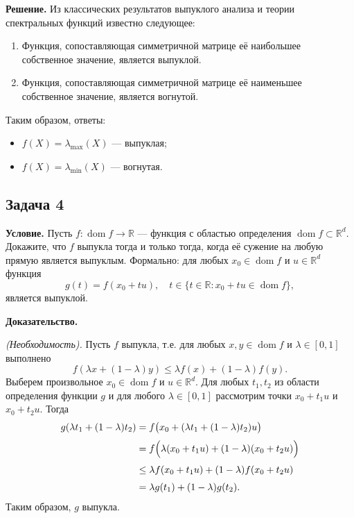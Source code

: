 \documentclass[a4paper,12pt]{article}
\begin{document}
	
	\textbf{Решение.} Из классических результатов выпуклого анализа и теории спектральных функций известно следующее:
	\begin{enumerate}[label=1)]
		\item Функция, сопоставляющая симметричной матрице её наибольшее собственное значение, является выпуклой.
		\item Функция, сопоставляющая симметричной матрице её наименьшее собственное значение, является вогнутой.
	\end{enumerate}
	Таким образом, ответы: 
	\begin{itemize}
		\item $f(X)=\lambda_{\max}(X)$ --- выпуклая;
		\item $f(X)=\lambda_{\min}(X)$ --- вогнутая.
	\end{itemize}
	
	\vspace{0.5em}
	
	\subsection*{Задача 4}
	\textbf{Условие.} Пусть $f:\operatorname{dom}f\to\mathbb{R}$ --- функция с областью определения $\operatorname{dom}f\subset\mathbb{R}^d$. Докажите, что $f$ выпукла тогда и только тогда, когда её сужение на любую прямую является выпуклым. Формально: для любых $x_0\in\operatorname{dom}f$ и $u\in\mathbb{R}^d$ функция 
	\[
	g(t)=f(x_0+tu),\quad t\in\{t\in\mathbb{R}:x_0+tu\in\operatorname{dom}f\},
	\]
	является выпуклой.
	
	\textbf{Доказательство.}
	
	\emph{(Необходимость).} Пусть $f$ выпукла, т.е. для любых $x,y\in\operatorname{dom}f$ и $\lambda\in[0,1]$ выполнено
	\[
	f(\lambda x+(1-\lambda)y)\le\lambda f(x)+(1-\lambda)f(y).
	\]
	Выберем произвольное $x_0\in\operatorname{dom}f$ и $u\in\mathbb{R}^d$. Для любых $t_1,t_2$ из области определения функции $g$ и для любого $\lambda\in[0,1]$ рассмотрим точки $x_0+t_1u$ и $x_0+t_2u$. Тогда
	\[
	\begin{aligned}
		g(\lambda t_1+(1-\lambda)t_2)&=f\bigl(x_0+(\lambda t_1+(1-\lambda)t_2)u\bigr)\\[1mm]
		&=f\Bigl(\lambda (x_0+t_1u)+(1-\lambda)(x_0+t_2u)\Bigr)\\[1mm]
		&\le \lambda f(x_0+t_1u)+(1-\lambda) f(x_0+t_2u)\\[1mm]
		&=\lambda g(t_1)+(1-\lambda)g(t_2).
	\end{aligned}
	\]
	Таким образом, $g$ выпукла.
	
\end{document}
